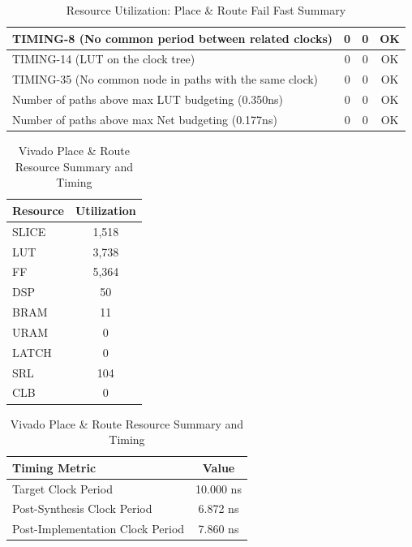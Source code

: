 \documentclass{article}
\begin{document}
\begin{table}[H]
{\begin{tabular}{|l|c|c|c|}
    TIMING-8 (No common period between related clocks)                 & 0                  & 0               & OK              \\ \hline
    TIMING-14 (LUT on the clock tree)                                  & 0                  & 0               & OK              \\ \hline
    TIMING-35 (No common node in paths with the same clock)            & 0                  & 0               & OK              \\ \hline
    Number of paths above max LUT budgeting (0.350ns)                 & 0                  & 0               & OK              \\ \hline
    Number of paths above max Net budgeting (0.177ns)                 & 0                  & 0               & OK              \\ \hline
    \end{tabular}
    }
    \caption{Resource Utilization: Place \& Route Fail Fast Summary}
    \label{tab:place-route-failfast-summary}
\end{table}

\vspace{5mm}

\begin{table}[H]
    \centering
    \begin{tabular}{|l|c|}
        \hline
        \textbf{Resource} & \textbf{Utilization} \\ \hline
        SLICE & 1,518 \\ \hline
        LUT & 3,738 \\ \hline
        FF & 5,364 \\ \hline
        DSP & 50 \\ \hline
        BRAM & 11 \\ \hline
        URAM & 0 \\ \hline
        LATCH & 0 \\ \hline
        SRL & 104 \\ \hline
        CLB & 0 \\ \hline
    \end{tabular}

    \vspace{5mm}

    \begin{tabular}{|l|c|}
        \hline
        \textbf{Timing Metric} & \textbf{Value} \\ \hline
        Target Clock Period & 10.000 ns \\ \hline
        Post-Synthesis Clock Period & 6.872 ns \\ \hline
        Post-Implementation Clock Period & 7.860 ns \\ \hline
    \end{tabular}
    \caption{Vivado Place \& Route Resource Summary and Timing}
    \label{tab:place-route-resource-timing}
\end{table}
\end{document}

